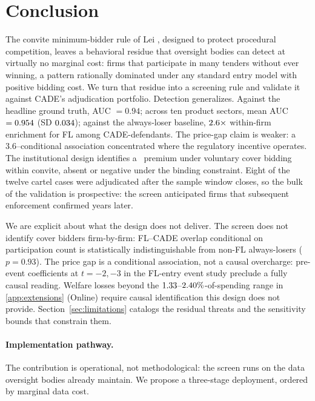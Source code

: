 \section{Conclusion}
\label{sec:conclusion}

The convite minimum-bidder rule of Lei \valLeiOriginal, designed to
protect procedural competition, leaves a behavioral residue that
oversight bodies can detect at virtually no marginal cost: firms
that participate in many tenders without ever winning, a pattern
rationally dominated under any standard entry model with
positive bidding cost. We turn that residue into a screening
rule and validate it against CADE's adjudication portfolio.
Detection generalizes. Against the headline ground truth, AUC
$=0.94$; across ten product sectors, mean AUC $=0.954$ (SD
$0.034$); against the always-loser baseline, $2.6\times$
within-firm enrichment for FL among CADE-defendants. The
price-gap claim is weaker: a 3.6--\valFLpremBottomReg conditional association
concentrated where the regulatory incentive operates. The
institutional design identifies a \valWelfareConclLow\ premium under voluntary
cover bidding within convite, absent or negative under the
binding constraint. Eight of the twelve cartel cases were
adjudicated after the sample window closes, so the bulk of the
validation is prospective: the screen anticipated firms that
subsequent enforcement confirmed years later.

We are explicit about what the design does not deliver. The
screen does not identify cover bidders firm-by-firm: FL--CADE
overlap conditional on participation count is statistically
indistinguishable from non-FL always-losers ($p = 0.93$). The
price gap is a conditional association, not a causal overcharge:
pre-event coefficients at $t = -2, -3$ in the FL-entry event
study preclude a fully causal reading. Welfare losses beyond
the $1.33$--$2.40\%$-of-spending range in \ref{app:extensions}
(Online) require causal identification this design does not
provide. Section~\ref{sec:limitations} catalogs the residual
threats and the sensitivity bounds that constrain them.

\paragraph{Implementation pathway.}
The contribution is operational, not methodological: the screen
runs on the data oversight bodies already maintain. We propose
a three-stage deployment, ordered by marginal data cost.

